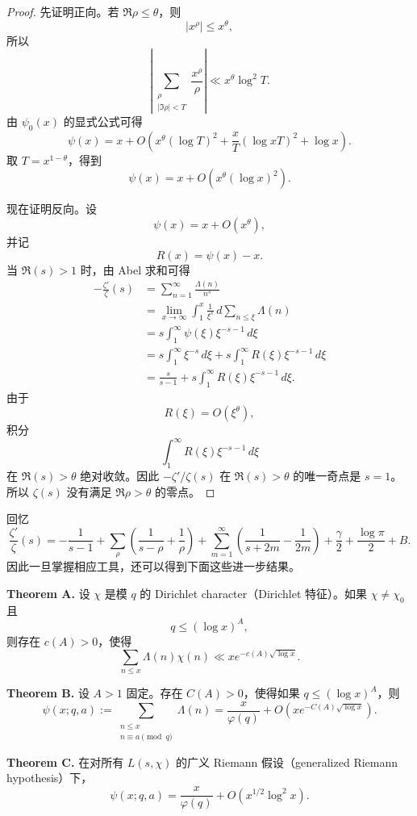 \begin{proof}
	先证明正向。若 $\Re\rho\leq\theta$，则
	\[
		|x^\rho|\leq x^\theta,
	\]
	所以
	\[
		\left|
		\sum_{\substack{\rho\\ |\Im\rho|<T}}
		\frac{x^\rho}{\rho}
		\right|
		\ll
		x^\theta\log^2T.
	\]
	由 $\psi_0(x)$ 的显式公式可得
	\[
		\psi(x)
		=
		x
		+
		O\left(
			x^\theta(\log T)^2
			+
			\frac{x}{T}(\log xT)^2
			+
			\log x
		\right).
	\]
	取 $T=x^{1-\theta}$，得到
	\[
		\psi(x)
		=
		x+O\left(x^\theta(\log x)^2\right).
	\]

	现在证明反向。设
	\[
		\psi(x)=x+O(x^\theta),
	\]
	并记
	\[
		R(x)=\psi(x)-x.
	\]
	当 $\Re(s)>1$ 时，由 Abel 求和可得
	\[
	\begin{aligned}
		-\frac{\zeta'}{\zeta}(s)
		&=
		\sum_{n=1}^{\infty}\frac{\Lambda(n)}{n^s} \\
		&=
		\lim_{x\to\infty}
		\int_1^x \frac1{\xi^s}\,d\sum_{n\leq\xi}\Lambda(n) \\
		&=
		s\int_1^\infty \psi(\xi)\xi^{-s-1}\,d\xi \\
		&=
		s\int_1^\infty \xi^{-s}\,d\xi
		+
		s\int_1^\infty R(\xi)\xi^{-s-1}\,d\xi \\
		&=
		\frac{s}{s-1}
		+
		s\int_1^\infty R(\xi)\xi^{-s-1}\,d\xi.
	\end{aligned}
	\]
	由于
	\[
		R(\xi)=O(\xi^\theta),
	\]
	积分
	\[
		\int_1^\infty R(\xi)\xi^{-s-1}\,d\xi
	\]
	在 $\Re(s)>\theta$ 绝对收敛。因此 $-\zeta'/\zeta(s)$ 在
	$\Re(s)>\theta$ 的唯一奇点是 $s=1$。所以 $\zeta(s)$ 没有满足
	$\Re\rho>\theta$ 的零点。
\end{proof}

回忆
\[
	\frac{\zeta'}{\zeta}(s)
	=
	-\frac1{s-1}
	+
	\sum_\rho\left(\frac1{s-\rho}+\frac1{\rho}\right)
	+
	\sum_{m=1}^{\infty}
	\left(\frac1{s+2m}-\frac1{2m}\right)
	+
	\frac{\gamma}{2}
	+
	\frac{\log\pi}{2}
	+
	B.
\]
因此一旦掌握相应工具，还可以得到下面这些进一步结果。

\medskip
\noindent\textbf{Theorem A.}
设 $\chi$ 是模 $q$ 的 Dirichlet character（Dirichlet 特征）。如果
$\chi\neq\chi_0$ 且
\[
	q\leq(\log x)^A,
\]
则存在 $c(A)>0$，使得
\[
	\sum_{n\leq x}\Lambda(n)\chi(n)
	\ll
	xe^{-c(A)\sqrt{\log x}}.
\]

\medskip
\noindent\textbf{Theorem B.}
设 $A>1$ 固定。存在 $C(A)>0$，使得如果 $q\leq(\log x)^A$，则
\[
	\psi(x;q,a)
	:=
	\sum_{\substack{n\leq x\\ n\equiv a\pmod q}}\Lambda(n)
	=
	\frac{x}{\varphi(q)}
	+
	O\left(xe^{-C(A)\sqrt{\log x}}\right).
\]

\medskip
\noindent\textbf{Theorem C.}
在对所有 $L(s,\chi)$ 的广义 Riemann 假设（generalized Riemann hypothesis）下，
\[
	\psi(x;q,a)
	=
	\frac{x}{\varphi(q)}
	+
	O\left(x^{1/2}\log^2 x\right).
\]
